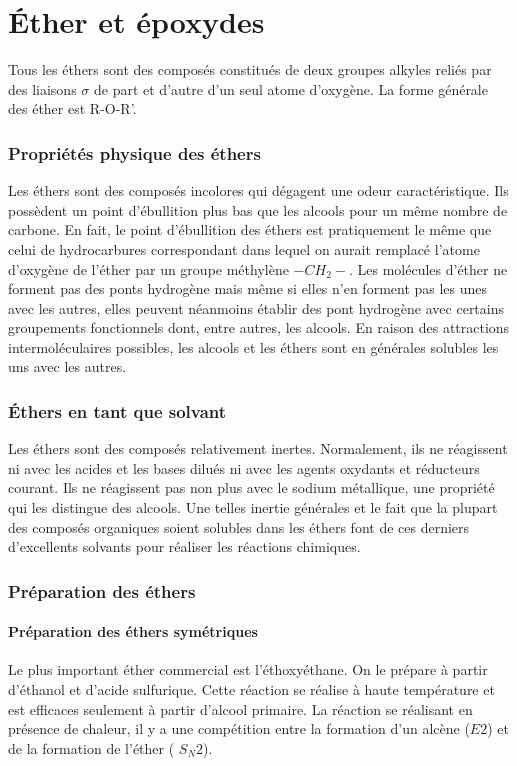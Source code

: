 \part{\'Ether et époxydes}
Tous les éthers sont des composés constitués de deux groupes alkyles reliés par des liaisons $\sigma$ de part et d'autre d'un seul atome d'oxygène.
La forme générale des éther est R-O-R'.
\section{Propriétés physique des éthers}

Les éthers sont des composés incolores qui dégagent une odeur caractéristique.
Ils possèdent un point d'ébullition plus bas que les alcools pour un même nombre de carbone.
En fait, le point d'ébullition des éthers est pratiquement le même que celui de hydrocarbures correspondant dans lequel on aurait remplacé l'atome d'oxygène de l'éther par un groupe méthylène $-CH_2-$.
Les molécules d'éther ne forment pas des ponts hydrogène mais même si elles n'en forment pas  les unes avec les autres, elles peuvent néanmoins établir des pont hydrogène avec certains groupements fonctionnels dont, entre autres, les alcools.
En raison des attractions intermoléculaires possibles, les alcools et les éthers sont en générales solubles les uns avec les autres.

\section{\'Ethers en tant que solvant}

Les éthers sont des composés relativement inertes.
Normalement, ils ne réagissent ni avec les acides et les bases dilués ni avec les agents oxydants et réducteurs courant.
Ils ne réagissent pas non plus avec le sodium métallique, une propriété qui les distingue des alcools.
Une telles inertie générales et le fait que la plupart des composés organiques soient solubles dans les éthers font de ces derniers d'excellents solvants pour réaliser les réactions chimiques.


\section{Préparation des éthers}
\subsection{Préparation des éthers symétriques}
Le plus important éther commercial est l'éthoxyéthane.
On le prépare à partir d'éthanol et d'acide sulfurique.
Cette réaction se réalise à haute température et est efficaces seulement à partir d'alcool primaire.
La réaction se réalisant en présence de chaleur, il y a une compétition entre la formation d'un alcène ($E2$) et de la formation de l'éther ( $S_N2$).


